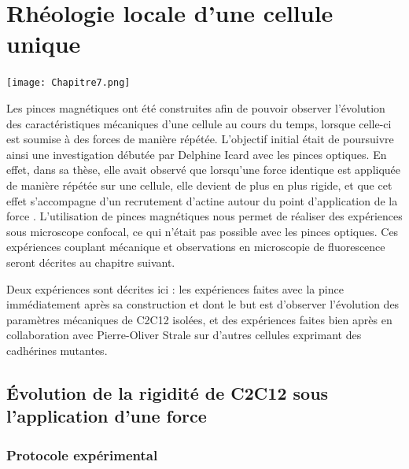 %
%

\chapter{Rhéologie locale d'une cellule unique}

\begin{center}
\texttt{[image: Chapitre7.png]}
\end{center}

\newpage

Les pinces magnétiques ont été construites afin de pouvoir observer l'évolution des caractéristiques mécaniques d'une cellule au cours du temps, lorsque celle-ci est soumise à des forces de manière répétée. L'objectif initial était de poursuivre ainsi une investigation débutée par Delphine Icard avec les pinces optiques. En effet, dans sa thèse, elle avait observé que lorsqu'une force identique est appliquée de manière répétée sur une cellule, elle devient de plus en plus rigide, et que cet effet s'accompagne d'un recrutement d'actine autour du point d'application de la force \parencite{icard-arcizet_cell_2008}. L'utilisation de pinces magnétiques nous permet de réaliser des expériences sous microscope confocal, ce qui n'était pas possible avec les pinces optiques. Ces expériences couplant mécanique et observations en microscopie de fluorescence seront décrites au chapitre suivant. 

Deux expériences sont décrites ici : les expériences faites avec la pince immédiatement après sa construction et dont le but est d'observer l'évolution des paramètres mécaniques de C2C12 isolées, et des expériences faites bien après en collaboration avec Pierre-Oliver Strale sur d'autres cellules exprimant des cadhérines mutantes. 

\section{\'Evolution de la rigidité de C2C12 sous l'application d'une force}

\subsection{Protocole expérimental}

